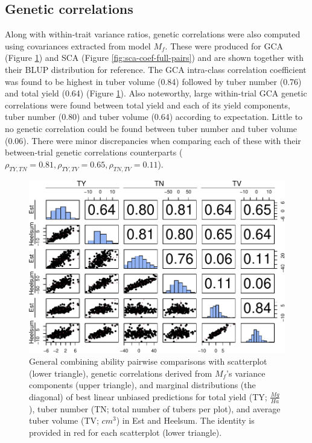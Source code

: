 \subsection{Genetic correlations}\label{genetic-correlations}

Along with within-trait variance ratios, genetic correlations were also computed using covariances extracted from model \(M_f\). These were produced for GCA (Figure \ref{fig:gca-coef-full-pairs}) and SCA (Figure \ref{fig:sca-coef-full-pairs}) and are shown together with their BLUP distribution for reference. The GCA intra-class correlation coefficient was found to be highest in tuber volume (0.84) followed by tuber number (0.76) and total yield (0.64) (Figure \ref{fig:gca-coef-full-pairs}). Also noteworthy, large within-trial GCA genetic correlations were found between total yield and each of its yield components, tuber number (0.80) and tuber volume (0.64) according to expectation. Little to no genetic correlation could be found between tuber number and tuber volume (0.06). There were minor discrepancies when comparing each of these with their between-trial genetic correlations counterparts (\(\rho_{TY,TN} = 0.81, \rho_{TY,TV} = 0.65, \rho_{TN,TV}=0.11\)).

\begin{figure}
\centering
\includegraphics[width=\linewidth]{./figs_02/Fig5.pdf}
\caption{\label{fig:gca-coef-full-pairs}General combining ability pairwise comparisons with scatterplot (lower triangle), genetic correlations derived from \(M_f\)'s variance components (upper triangle), and marginal distributions (the diagonal) of best linear unbiased predictions for total yield (TY; \(\frac{Mg}{Ha}\)), tuber number (TN; total number of tubers per plot), and average tuber volume (TV; \(cm^3\)) in Est and Heelsum. The identity is provided in red for each scatterplot (lower triangle).}
\end{figure}


